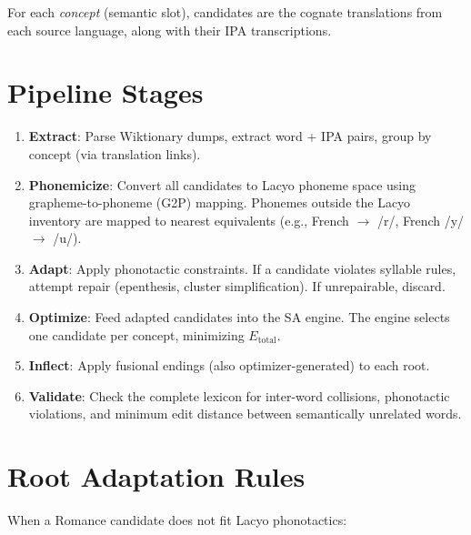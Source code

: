 \documentclass[12pt]{book}
\begin{document}
For each \emph{concept} (semantic slot), candidates are the cognate translations
from each source language, along with their IPA transcriptions.

\section{Pipeline Stages}

\begin{enumerate}
  \item \textbf{Extract}: Parse Wiktionary dumps, extract word + IPA pairs,
        group by concept (via translation links).
  \item \textbf{Phonemicize}: Convert all candidates to Lacyo phoneme space
        using grapheme-to-phoneme (G2P) mapping. Phonemes outside the Lacyo
        inventory are mapped to nearest equivalents (e.g., French
         $\to$ /r/, French /y/ $\to$ /u/).
  \item \textbf{Adapt}: Apply phonotactic constraints. If a candidate violates
        syllable rules, attempt repair (epenthesis, cluster simplification).
        If unrepairable, discard.
  \item \textbf{Optimize}: Feed adapted candidates into the SA engine.
        The engine selects one candidate per concept, minimizing
        $E_{\text{total}}$.
  \item \textbf{Inflect}: Apply fusional endings (also optimizer-generated)
        to each root.
  \item \textbf{Validate}: Check the complete lexicon for inter-word collisions,
        phonotactic violations, and minimum edit distance between
        semantically unrelated words.
\end{enumerate}


\section{Root Adaptation Rules}

When a Romance candidate does not fit Lacyo phonotactics:
\end{document}
